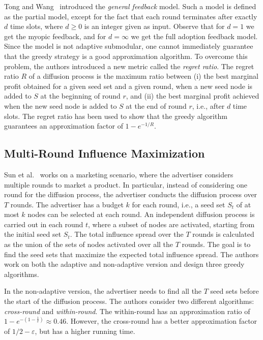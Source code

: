 Tong and Wang~\cite{Tong2019} introduced the \emph{general feedback} model. Such a model is defined as the partial model, except for the fact that each round terminates after exactly $d$ time slots, where $d\geq 0$ is an integer given as input. Observe that for $d=1$ we get the myopic feedback, and for $d=\infty$ we get the full adoption feedback model.  Since the model is not adaptive submodular, one cannot immediately guarantee that the greedy strategy is a good approximation algorithm. To overcome this problem, the authors introduced a new metric called the \emph{regret ratio}. The regret ratio $R$ of a diffusion process is the maximum ratio between (i) the best marginal profit obtained for a given seed set and a given round, when a new seed node is added to $S$ at the beginning of round $r$, and (ii) the best marginal profit achieved when the new seed node is added to $S$ at the end of round $r$, i.e., after $d$ time slots. The regret ratio has been used to show that the greedy algorithm guarantees an approximation factor of $1-e^{-1/R}$. 
 

\subsection{Multi-Round Influence Maximization}
Sun et al.~\cite{Sun2018} works on a marketing scenario, where the advertiser considers multiple rounds to market a product. In particular, instead of considering one round for the diffusion process, the advertiser conducts the diffusion process over $T$ rounds. The advertiser has a budget $k$ for each round, i.e., a seed set $S_t$ of at most $k$ nodes can be selected at each round. An independent diffusion process is carried out in each round $t$, where a subset of nodes are activated, starting from the initial seed set $S_t$. The total influence spread over the $T$ rounds is calculated as the union of the sets of nodes activated over all the $T$ rounds. The goal is to find the seed sets that maximize the expected total influence spread. The authors work on both the adaptive and non-adaptive version and design three greedy algorithms.

In the non-adaptive version, the advertiser needs to find all the $T$ seed sets before the start of the diffusion process. The authors consider two different algorithms: \emph{cross-round} and \emph{within-round}.
The within-round has an approximation ratio of $1-e^{-(1-\frac{1}{e})} \approx 0.46$. However, the cross-round has a better approximation factor of $1/2 - \varepsilon$, but has a higher running time. 

